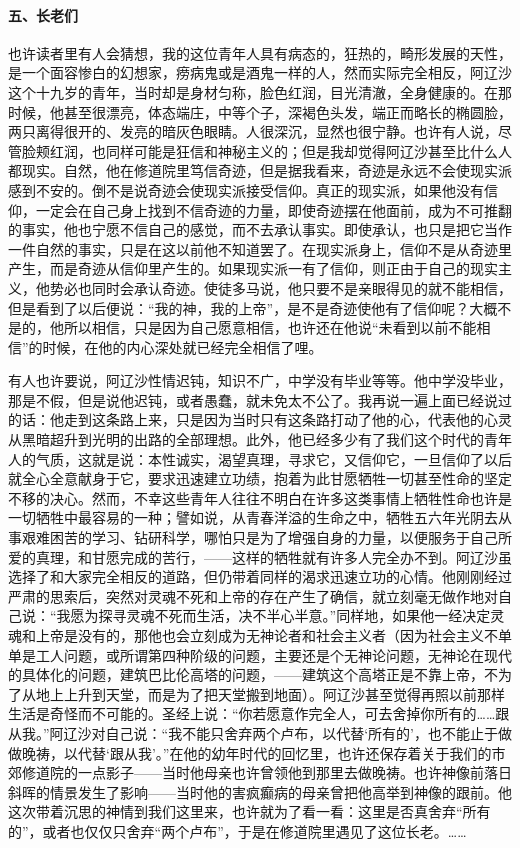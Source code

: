 \paragraph*{五、长老们}
\par 也许读者里有人会猜想，我的这位青年人具有病态的，狂热的，畸形发展的天性，是一个面容惨白的幻想家，痨病鬼或是酒鬼一样的人，然而实际完全相反，阿辽沙这个十九岁的青年，当时却是身材匀称，脸色红润，目光清澈，全身健康的。在那时候，他甚至很漂亮，体态端庄，中等个子，深褐色头发，端正而略长的椭圆脸，两只离得很开的、发亮的暗灰色眼睛。人很深沉，显然也很宁静。也许有人说，尽管脸颊红润，也同样可能是狂信和神秘主义的；但是我却觉得阿辽沙甚至比什么人都现实。自然，他在修道院里笃信奇迹，但是据我看来，奇迹是永远不会使现实派感到不安的。倒不是说奇迹会使现实派接受信仰。真正的现实派，如果他没有信仰，一定会在自己身上找到不信奇迹的力量，即使奇迹摆在他面前，成为不可推翻的事实，他也宁愿不信自己的感觉，而不去承认事实。即使承认，也只是把它当作一件自然的事实，只是在这以前他不知道罢了。在现实派身上，信仰不是从奇迹里产生，而是奇迹从信仰里产生的。如果现实派一有了信仰，则正由于自己的现实主义，他势必也同时会承认奇迹。使徒多马说，他只要不是亲眼得见的就不能相信，但是看到了以后便说：“我的神，我的上帝”，是不是奇迹使他有了信仰呢？大概不是的，他所以相信，只是因为自己愿意相信，也许还在他说“未看到以前不能相信”的时候，在他的内心深处就已经完全相信了哩。
\par 有人也许要说，阿辽沙性情迟钝，知识不广，中学没有毕业等等。他中学没毕业，那是不假，但是说他迟钝，或者愚蠢，就未免太不公了。我再说一遍上面已经说过的话：他走到这条路上来，只是因为当时只有这条路打动了他的心，代表他的心灵从黑暗超升到光明的出路的全部理想。此外，他已经多少有了我们这个时代的青年人的气质，这就是说：本性诚实，渴望真理，寻求它，又信仰它，一旦信仰了以后就全心全意献身于它，要求迅速建立功绩，抱着为此甘愿牺牲一切甚至性命的坚定不移的决心。然而，不幸这些青年人往往不明白在许多这类事情上牺牲性命也许是一切牺牲中最容易的一种；譬如说，从青春洋溢的生命之中，牺牲五六年光阴去从事艰难困苦的学习、钻研科学，哪怕只是为了增强自身的力量，以便服务于自己所爱的真理，和甘愿完成的苦行，——这样的牺牲就有许多人完全办不到。阿辽沙虽选择了和大家完全相反的道路，但仍带着同样的渴求迅速立功的心情。他刚刚经过严肃的思索后，突然对灵魂不死和上帝的存在产生了确信，就立刻毫无做作地对自己说：“我愿为探寻灵魂不死而生活，决不半心半意。”同样地，如果他一经决定灵魂和上帝是没有的，那他也会立刻成为无神论者和社会主义者（因为社会主义不单单是工人问题，或所谓第四种阶级的问题，主要还是个无神论问题，无神论在现代的具体化的问题，建筑巴比伦高塔的问题，——建筑这个高塔正是不靠上帝，不为了从地上上升到天堂，而是为了把天堂搬到地面）。阿辽沙甚至觉得再照以前那样生活是奇怪而不可能的。圣经上说：“你若愿意作完全人，可去舍掉你所有的……跟从我。”阿辽沙对自己说：“我不能只舍弃两个卢布，以代替‘所有的’，也不能止于做做晚祷，以代替‘跟从我’。”在他的幼年时代的回忆里，也许还保存着关于我们的市郊修道院的一点影子——当时他母亲也许曾领他到那里去做晚祷。也许神像前落日斜晖的情景发生了影响——当时他的害疯癫病的母亲曾把他高举到神像的跟前。他这次带着沉思的神情到我们这里来，也许就为了看一看：这里是否真舍弃“所有的”，或者也仅仅只舍弃“两个卢布”，于是在修道院里遇见了这位长老。……
